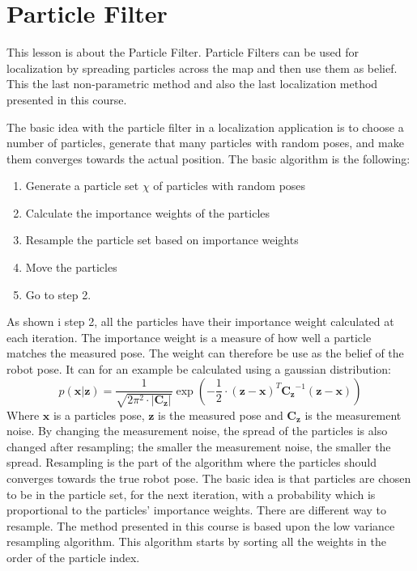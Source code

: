 \documentclass[Main]{subfiles}
\begin{document}
\section{Particle Filter} %
	\label{sec:particlefilter}
This lesson is about the Particle Filter. 
Particle Filters can be used for localization by spreading particles across the map and then use them as belief. This the last non-parametric method and also the last localization method presented in this course.

The basic idea with the particle filter in a localization application is to choose a number of particles, generate that many particles with random poses, and make them converges towards the actual position.
The basic algorithm is the following:
\begin{enumerate}
\item Generate a particle set $\chi$ of particles with random poses 
\item Calculate the importance weights of the particles 
\item Resample the particle set based on importance weights
\item Move the particles
\item Go to step 2.
\end{enumerate}
As shown i step 2, all the particles have their importance weight calculated at each iteration.
The importance weight is a measure of how well a particle matches the measured pose.
The weight can therefore be use as the belief of the robot pose.
It can for an example be calculated using a gaussian distribution:
\begin{equation}
	p(\mathbf{x}|\mathbf{z}) = \frac{1}{\sqrt{2\pi^2 \cdot |\mathbf{C_z}|}} \exp \left( -\frac{1}{2}\cdot (\mathbf{z}-\mathbf{x})^T \mathbf{C_z}^{-1} (\mathbf{z}-\mathbf{x}) \right)
\end{equation}
Where $\mathbf{x}$ is a particles pose, $\mathbf{z}$ is the measured pose and $\mathbf{C_z}$ is the measurement noise.
By changing the measurement noise, the spread of the particles is also changed after resampling; the smaller the measurement noise, the smaller the spread.
Resampling is the part of the algorithm where the particles should converges towards the true robot pose.
The basic idea is that particles are chosen to be in the particle set, for the next iteration, with a probability which is proportional to the particles' importance weights.
There are different way to resample.
The method presented in this course is based upon the low variance resampling algorithm.
This algorithm starts by sorting all the weights in the order of the particle index.
\end{document}
